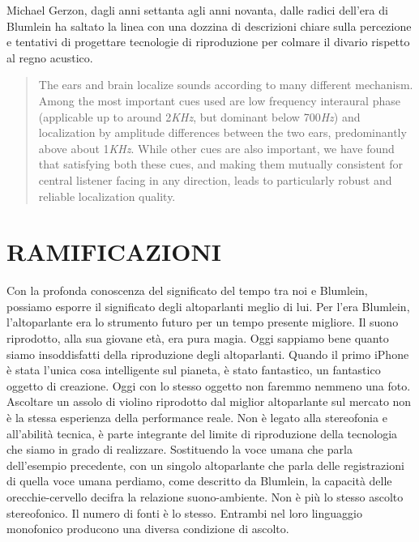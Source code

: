 Michael Gerzon, dagli anni settanta agli anni novanta, dalle radici dell'era di
Blumlein ha saltato la linea con una dozzina di descrizioni chiare sulla
percezione e tentativi di progettare tecnologie di riproduzione per colmare il
divario rispetto al regno acustico.

\begin{quotation}
The ears and brain localize sounds according to many different mechanism. Among
the most important cues used are low frequency interaural phase (applicable up
to around 2\emph{KHz}, but dominant below 700\emph{Hz}) and localization by
amplitude differences between the two ears, predominantly above about
1\emph{KHz}. While other cues are also important, we have found that satisfying
both these cues, and making them mutually consistent for central listener facing
in any direction, leads to particularly robust and reliable localization
quality.\cite{mg92pdmsss}
\end{quotation}
%
%
%
\section{RAMIFICAZIONI}
%
Con la profonda conoscenza del significato del tempo tra noi e Blumlein,
possiamo esporre il significato degli altoparlanti meglio di lui. Per l'era
Blumlein, l'altoparlante era lo strumento futuro per un tempo presente migliore.
Il suono riprodotto, alla sua giovane età, era pura magia. Oggi sappiamo bene
quanto siamo insoddisfatti della riproduzione degli altoparlanti. Quando il
primo iPhone è stata l'unica cosa intelligente sul pianeta, è stato fantastico,
un fantastico oggetto di creazione. Oggi con lo stesso oggetto non faremmo
nemmeno una foto. Ascoltare un assolo di violino riprodotto dal miglior
altoparlante sul mercato non è la stessa esperienza della performance reale.
Non è legato alla stereofonia e all'abilità tecnica, è parte integrante del
limite di riproduzione della tecnologia che siamo in grado di realizzare.
%
Sostituendo la voce umana che parla dell'esempio precedente, con un singolo
altoparlante che parla delle registrazioni di quella voce umana perdiamo, come
descritto da Blumlein, la capacità delle orecchie-cervello decifra la relazione
suono-ambiente. Non è più lo stesso ascolto stereofonico. Il numero di fonti è
lo stesso. Entrambi nel loro linguaggio monofonico producono una diversa
condizione di ascolto.%

